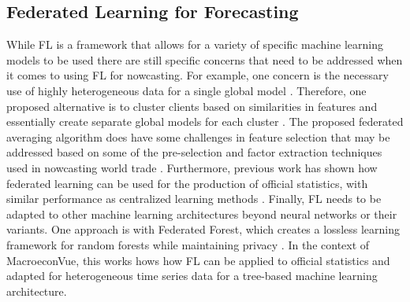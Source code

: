 \documentclass[conference]{IEEEtran}
\begin{document}
\subsection{Federated Learning for Forecasting}
While FL is a framework that allows for a variety of specific machine learning models to be used there are still specific concerns that need to be addressed when it comes to using FL for nowcasting. For example, one concern is the necessary use of highly heterogeneous data for a single global model \cite{fl_lstm}. Therefore, one proposed alternative is to cluster clients based on similarities in features and essentially create separate global models for each cluster \cite{fl_lstm}. The proposed federated averaging algorithm does have some challenges in feature selection that may be addressed based on some of the pre-selection and factor extraction techniques used in nowcasting world trade \cite{world_trade}. Furthermore, previous work has shown how federated learning can be used for the production of official statistics, with similar performance as centralized learning methods \cite{fl_stats}. Finally, FL needs to be adapted to other machine learning architectures beyond neural networks or their variants. One approach is with Federated Forest, which creates a lossless learning framework for random forests while maintaining privacy \cite{fed_forest}. In the context of MacroeconVue, this works hows how FL can be applied to official statistics and adapted for heterogeneous time series data for a tree-based machine learning architecture.
\end{document}
